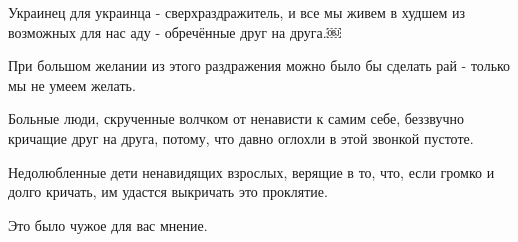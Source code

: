 Украинец для украинца - сверхраздражитель, и все мы живем в худшем из возможных
для нас аду - обречённые друг на друга.￼

При большом желании из этого раздражения можно было бы сделать рай - только мы
не умеем желать.

Больные люди, скрученные волчком от ненависти к самим себе, беззвучно кричащие
друг на друга, потому, что давно оглохли в этой звонкой пустоте.

Недолюбленные дети ненавидящих взрослых, верящие в то, что, если громко и долго
кричать, им удастся выкричать это проклятие.

Это было чужое для вас мнение. 

